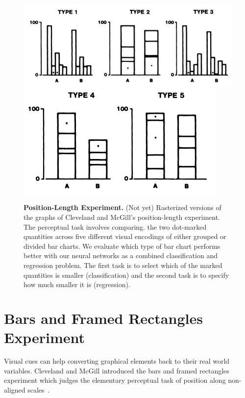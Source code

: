 \documentclass[journal]{vgtc}                %
\begin{document}
\begin{figure}[t]
	  \includegraphics[width=\linewidth]{position_length_original1.png}
	  \includegraphics[width=\linewidth]{position_length_original2.png}
	  
  \caption{\textbf{Position-Length Experiment.} (Not yet) Rasterized versions of the graphs of Cleveland and McGill's position-length experiment. The perceptual task involves comparing. the two dot-marked quantities across five different visual encodings of either grouped or divided bar charts. We evaluate which type of bar chart performs better with our neural networks as a combined classification and regression problem. The first task is to select which of the marked quantities is smaller (classification) and the second task is to specify how much smaller it is (regression).}
	\label{fig:position_length_experiment}
\end{figure}

\section{Bars and Framed Rectangles Experiment}

Visual cues can help converting graphical elements back to their real world variables. Cleveland and McGill introduced the bars and framed rectangles experiment which judges the elementary perceptual task of position along non-aligned scales~\cite{cleveland_mcgill}. 
\end{document}
